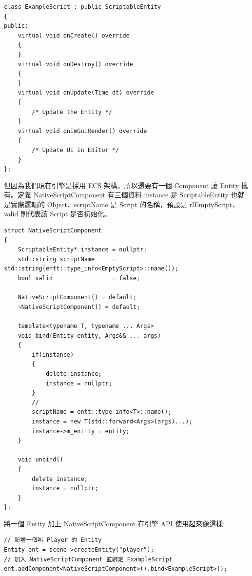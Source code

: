\begin{lstlisting}
class ExampleScript : public ScriptableEntity
{
public:
    virtual void onCreate() override
    {
    }
    virtual void onDestroy() override
    {
    }
    virtual void onUpdate(Time dt) override
    {
    	/* Update the Entity */
    }
    virtual void onImGuiRender() override
    {
    	/* Update UI in Editor */
    }
};
\end{lstlisting}

但因為我們現在引擎是採用 ECS 架構，所以還要有一個 Component 讓 Entity 擁有。定義 NativeScriptComponent 有三個資料\: instance 是 ScriptableEntity 也就是實際邏輯的 Object、scriptName 是 Script 的名稱，預設是 rl\:\:EmptyScript、valid 則代表該 Script 是否初始化。



\begin{lstlisting}
struct NativeScriptComponent
{
    ScriptableEntity* instance = nullptr;
    std::string scriptName     = std::string{entt::type_info<EmptyScript>::name()};
    bool valid                 = false;

    NativeScriptComponent() = default;
    ~NativeScriptComponent() = default;

    template<typename T, typename ... Args>
    void bind(Entity entity, Args&& ... args)
    {
        if(instance)
        {
            delete instance;
            instance = nullptr;
        }
        //
        scriptName = entt::type_info<T>::name();
        instance = new T(std::forward<Args>(args)...);
        instance->m_entity = entity;
    }

    void unbind()
    {
        delete instance;
        instance = nullptr;
    }
};
\end{lstlisting}

將一個 Entity 加上 NativeScriptComponent 在引擎 API 使用起來像這樣:

\begin{lstlisting}
// 新增一個叫 Player 的 Entity
Entity ent = scene->createEntity("player");
// 加入 NativeScriptComponent 並綁定 ExampleScript
ent.addComponent<NativeScriptComponent>().bind<ExampleScript>();
\end{lstlisting}


